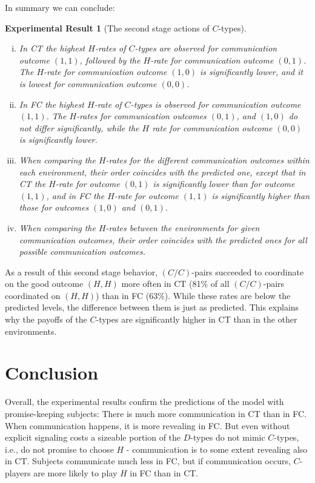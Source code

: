 \documentclass[12pt]{article}
\theoremstyle{break}
\newtheorem{result}{Experimental Result}\theoremstyle{break}
\begin{document}
In summary we can conclude: 
\begin{result}[The second stage actions of $C$-types]
	\begin{enumerate}[i)]\setlength\itemsep{0em}
		\item In CT the highest $H$-rates of $C$-types are observed for communication outcome $(1,1)$, followed by the $H$-rate for communication outcome $(0,1)$. The $H$-rate for communication outcome $(1,0)$ is significantly lower, and it is lowest for communication outcome $(0,0)$.
		\item In FC the highest $H$-rate of $C$-types is observed for communication outcome $(1,1)$. The $H$-rates for communication outcomes $(0,1)$, and $(1,0)$ do not differ significantly, while the $H$ rate for communication outcome $(0,0)$ is significantly lower. 
		\item When comparing the $H$-rates for the different communication outcomes within each environment, their order coincides with the predicted one, except that in CT the $H$-rate for outcome $(0,1)$ is significantly lower than for outcome $(1,1)$, and in FC the $H$-rate for outcome $(1,1)$ is significantly higher than those for outcomes $(1,0)$ and $(0,1)$.
		\item When comparing the $H$-rates between the environments for given communication outcomes, their order coincides with the predicted ones for all possible communication outcomes.
	\end{enumerate}
\end{result}
%

As a result of this second stage behavior, $(C/C)$-pairs succeeded to coordinate on the good outcome $(H,H)$ more often in CT (81\% of all $(C/C)$-pairs coordinated on $(H,H)$) than in FC (63\%). While these rates are below the predicted levels, the difference between them is just as predicted. This explains why the payoffs of the $C$-types are significantly higher in CT than in the other environments.



\section{Conclusion}
Overall, the experimental results confirm the predictions of the model with promise-keeping subjects: There is much more communication in CT than in FC. When communication happens, it is more revealing in FC. But even without explicit signaling costs a sizeable portion of the $D$-types do not mimic $C$-types, i.e., do not promise to choose $H$ - communication is to some extent revealing also in CT. Subjects communicate much less in FC, but if communication occurs, $C$-players are more likely to play $H$ in FC than in CT. 
\end{document}
